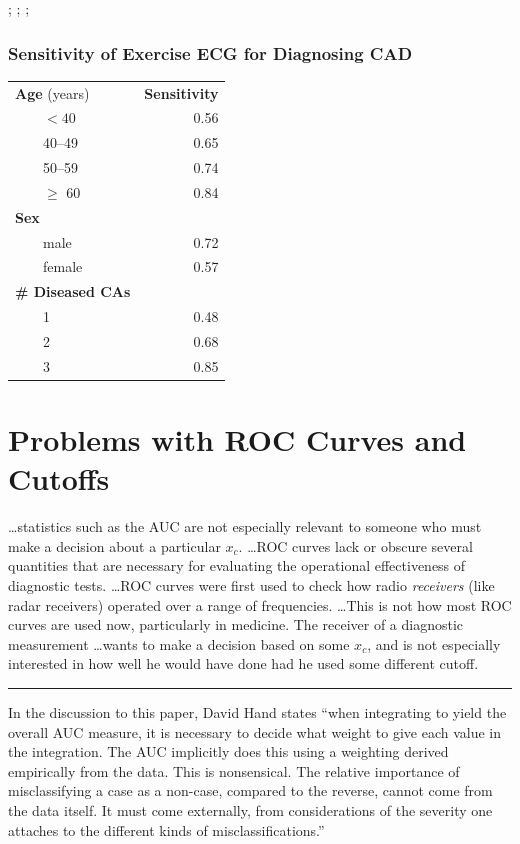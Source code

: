 \citet{hla84fac}; \cite{moo97lim}; \citet{moo03sen}; \citet{gne07str}

\subsubsection{Sensitivity of Exercise ECG for Diagnosing CAD}
\begin{center}\smaller
\begin{tabular}{lr} \hline
\textbf{Age} (years) & \textbf{Sensitivity} \\
~~~~$<40$ & 0.56 \\
~~~~40--49& 0.65 \\
~~~~50--59 & 0.74 \\
~~~~$\geq$ 60 & 0.84 \\ \hline
\textbf{Sex} & \\
~~~~male & 0.72 \\
~~~~female & 0.57 \\ \hline
\textbf{\# Diseased CAs} & \\
~~~~1 & 0.48 \\
~~~~2 & 0.68 \\
~~~~3 & 0.85 \\ \hline
\end{tabular}\end{center}
\citet{hla84fac}

\section{Problems with ROC Curves and Cutoffs}
{\smaller \ldots statistics such as the AUC are not especially relevant to someone who
must make a decision about a particular $x_{c}$.  \ldots ROC curves
lack or obscure several quantities that are necessary for evaluating
the operational effectiveness of diagnostic tests. \ldots ROC curves
were first used to check how radio \emph{receivers} (like radar
receivers) operated over a range of frequencies. \ldots This is not
how most ROC curves are used now, particularly in medicine.  The
receiver of a diagnostic measurement \ldots wants to make a decision
based on some $x_{c}$, and is not especially interested in how well he
would have done had he used some different cutoff.~\citet{bri08ski}
\\[1ex]
\hrule
In the discussion to this paper, David Hand
states ``when integrating to yield the overall 
AUC measure, it is necessary to decide what weight to give each value
in the integration.  The AUC implicitly does this using a weighting
derived empirically from the data.  This is nonsensical.  The relative 
importance of misclassifying a case as a non-case, compared to the
reverse, cannot come from the data itself.  It must come externally,
from considerations of the severity one attaches to the different
kinds of misclassifications.''}

